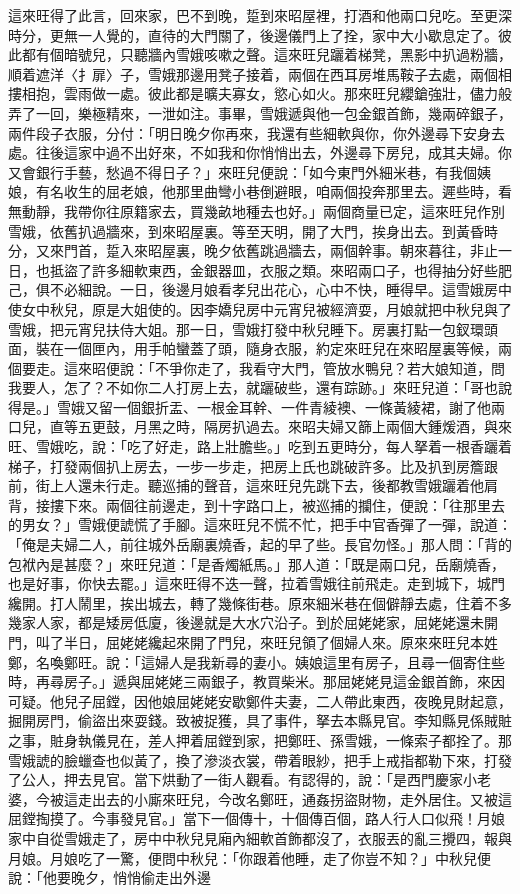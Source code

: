 這來旺得了此言，回來家，巴不到晚，踅到來昭屋裡，打酒和他兩口兒吃。至更深時分，更無一人覺的，直待的大門關了，後邊儀門上了拴，家中大小歇息定了。彼此都有個暗號兒，只聽牆內雪娥咳嗽之聲。這來旺兒躧着梯凳，黑影中扒過粉牆，順着遮洋〈扌扉〉子，雪娥那邊用凳子接着，兩個在西耳房堆馬鞍子去處，兩個相摟相抱，雲雨做一處。彼此都是曠夫寡女，慾心如火。那來旺兒纓鎗強壯，儘力般弄了一回，樂極精來，一泄如注。事畢，雪娥遞與他一包金銀首飾，幾兩碎銀子，兩件段子衣服，分付：「明日晚夕你再來，我還有些細軟與你，你外邊尋下安身去處。往後這家中過不出好來，不如我和你悄悄出去，外邊尋下房兒，成其夫婦。你又會銀行手藝，愁過不得日子？」來旺兒便說：「如今東門外細米巷，有我個姨娘，有名收生的屈老娘，他那里曲彎小巷倒避眼，咱兩個投奔那里去。遲些時，看無動靜，我帶你往原籍家去，買幾畝地種去也好。」兩個商量已定，這來旺兒作別雪娥，依舊扒過牆來，到來昭屋裏。等至天明，開了大門，挨身出去。到黃昏時分，又來門首，踅入來昭屋裏，晚夕依舊跳過牆去，兩個幹事。朝來暮往，非止一日，也抵盜了許多細軟東西，金銀器皿，衣服之類。來昭兩口子，也得抽分好些肥己，俱不必細說。一日，後邊月娘看孝兒出花心，心中不快，睡得早。這雪娥房中使女中秋兒，原是大姐使的。因李嬌兒房中元宵兒被經濟耍，月娘就把中秋兒與了雪娥，把元宵兒扶侍大姐。那一日，雪娥打發中秋兒睡下。房裏打點一包釵環頭面，裝在一個匣內，用手帕蠻蓋了頭，隨身衣服，約定來旺兒在來昭屋裏等候，兩個要走。這來昭便說：「不爭你走了，我看守大門，管放水鴨兒？若大娘知道，問我要人，怎了？不如你二人打房上去，就躧破些，還有踪跡。」來旺兒道：「哥也說得是。」雪娥又留一個銀折盂、一根金耳幹、一件青綾襖、一條黃綾裙，謝了他兩口兒，直等五更鼓，月黑之時，隔房扒過去。來昭夫婦又篩上兩個大鍾煖酒，與來旺、雪娥吃，說：「吃了好走，路上壯膽些。」吃到五更時分，每人拏着一根香躧着梯子，打發兩個扒上房去，一步一步走，把房上氏也跳破許多。比及扒到房簷跟前，街上人還未行走。聽巡捕的聲音，這來旺兒先跳下去，後都教雪娥躧着他肩背，接摟下來。兩個往前邊走，到十字路口上，被巡捕的攔住，便說：「往那里去的男女？」雪娥便諕慌了手腳。這來旺兒不慌不忙，把手中官香彈了一彈，說道：「俺是夫婦二人，前往城外岳廟裏燒香，起的早了些。長官勿怪。」那人問：「背的包袱內是甚麼？」來旺兒道：「是香燭紙馬。」那人道：「既是兩口兒，岳廟燒香，也是好事，你快去罷。」這來旺得不迭一聲，拉着雪娥往前飛走。走到城下，城門纔開。打人鬧里，挨出城去，轉了幾條街巷。原來細米巷在個僻靜去處，住着不多幾家人家，都是矮房低廈，後邊就是大水穴沿子。到於屈姥姥家，屈姥姥還未開門，叫了半日，屈姥姥纔起來開了門兒，來旺兒領了個婦人來。原來來旺兒本姓鄭，名喚鄭旺。說：「這婦人是我新尋的妻小。姨娘這里有房子，且尋一個寄住些時，再尋房子。」遞與屈姥姥三兩銀子，教買柴米。那屈姥姥見這金銀首飾，來因可疑。他兒子屈鏜，因他娘屈姥姥安歇鄭件夫妻，二人帶此東西，夜晚見財起意，掘開房門，偷盜出來耍錢。致被捉獲，具了事件，拏去本縣見官。李知縣見係賊賍之事，賍身執儀見在，差人押着屈鏜到家，把鄭旺、孫雪娥，一條索子都拴了。那雪娥諕的臉蠟查也似黃了，換了滲淡衣裳，帶着眼紗，把手上戒指都勒下來，打發了公人，押去見官。當下烘動了一街人觀看。有認得的，說：「是西門慶家小老婆，今被這走出去的小廝來旺兒，今改名鄭旺，通姦拐盜財物，走外居住。又被這屈鏜掏摸了。今事發見官。」當下一個傳十，十個傳百個，路人行人口似飛！月娘家中自從雪娥走了，房中中秋兒見廂內細軟首飾都沒了，衣服丟的亂三攪四，報與月娘。月娘吃了一驚，便問中秋兒：「你跟着他睡，走了你豈不知？」中秋兒便說：「他要晚夕，悄悄偷走出外邊